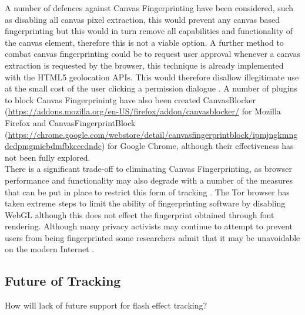 \documentclass{article}
\begin{document}
A number of defences against Canvas Fingerprinting have been considered, such as disabling all canvas pixel extraction, this would prevent any canvas based fingerprinting but this would in turn remove all capabilities and functionality of the canvas element, therefore this is not a viable option. A further method to combat canvas fingerprinting could be to request user approval whenever a canvas extraction is requested by the browser, this technique is already implemented with the HTML5 geolocation APIs. This would therefore disallow illegitimate use at the small cost of the user clicking a permission dialogue \parencite{canvasFP}. A number of plugins to block Canvas Fingerprinintg have also been created CanvasBlocker (\url{https://addons.mozilla.org/en-US/firefox/addon/canvasblocker/} for Mozilla Firefox and CanvasFingerprintBlock (\url{https://chrome.google.com/webstore/detail/canvasfingerprintblock/ipmjngkmngdcdpmgmiebdmfbkcecdndc}) for Google Chrome, although their effectiveness has not been fully explored. \\  

There is a significant trade-off to eliminating Canvas Fingerprinting, as browser performance and functionality may also degrade with a number of the measures that can be put in place to restrict this form of tracking \parencite{canvasFP}. The Tor browser has taken extreme steps to limit the ability of fingerprinting software by disabling WebGL although this does not effect the fingerprint obtained through font rendering. Although many privacy activists may continue to attempt to prevent users from being fingerprinted some researchers admit that it may be unavoidable on the modern Internet \parencite{canvasFP}.

\subsection{Future of Tracking}
How will lack of future support for flash effect tracking?

\end{document}
